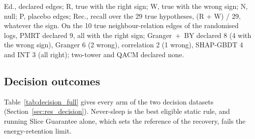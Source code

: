\begin{table}[tbp]
\par\smallskip
{\raggedright\footnotesize
Ed., declared edges; R, true with the right sign; W, true with the wrong sign; N, null; P, placebo edges; Rec., recall
over the 29 true hypotheses, (R + W) / 29, whatever the sign. On the 10 true neighbour-relation edges of the randomised logs, PMRT declared 9, all with
the right sign; Granger~+~BY declared 8 (4 with the wrong sign), Granger 6 (2 wrong), correlation 2 (1 wrong), SHAP-GBDT 4
and INT 3 (all right); two-tower and QACM declared none.\par}
\end{table}

\subsection{Decision outcomes}
\label{app:decision_full}

Table~\ref{tab:decision_full} gives every arm of the two decision datasets (Section~\ref{sec:res_decision}). Never-sleep
is the best eligible static rule, and running Slice Guarantee alone, which sets the reference of the recovery, fails the
energy-retention limit.

